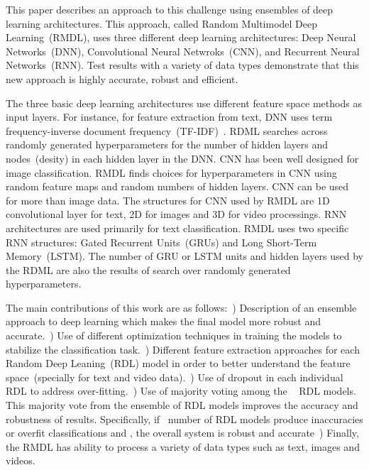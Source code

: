 \documentclass[sigconf, final]{acmart}
\begin{document}
This paper describes an approach to this challenge using ensembles of deep learning architectures. This approach, called Random Multimodel Deep Learning~(RMDL), uses three different deep learning architectures: Deep Neural Networks~(DNN), Convolutional Neural Netwroks~(CNN), and Recurrent Neural Networks~(RNN). Test results with a variety of data types demonstrate that this new approach is highly accurate, robust and efficient.

The three basic deep learning architectures use different feature space methods as input layers. For instance, for feature extraction from text, DNN uses term frequency-inverse document frequency~(TF-IDF)~\cite{robertson2004understanding}. RDML searches across randomly generated hyperparameters for the number of hidden layers and nodes~(desity) in each hidden layer in the DNN.
CNN has been well designed for image classification. RMDL finds choices for hyperparameters in CNN using random feature maps and random numbers of hidden layers. CNN can be used for more than image data. The structures for CNN used by RMDL are 1D convolutional layer for text, 2D for images and 3D for video processings.
RNN architectures are used primarily for text classification. RMDL uses two specific RNN structures: Gated Recurrent Units~(GRUs) and Long Short-Term Memory~(LSTM). The number of GRU or LSTM units and hidden layers used by the RDML are also the results of search over randomly generated hyperparameters.


The main contributions of this work are as follows:~) Description of an ensemble approach to deep learning which makes the final model more robust and accurate.~) Use of different optimization techniques in training the models to stabilize the classification task.~) Different feature extraction approaches for each Random Deep Leaning~(RDL) model in order to better understand the feature space~(specially for text and video data).~) Use of dropout in each individual RDL to address over-fitting.~) Use of majority voting among the ~ RDL models. This majority vote from the ensemble of RDL models improves the accuracy and robustness of results. Specifically, if~ number of RDL models produce inaccuracies or overfit classifications and , the overall system is robust and accurate~) Finally, the RMDL has ability to process a variety of data types such as text, images and videos.
\end{document}
